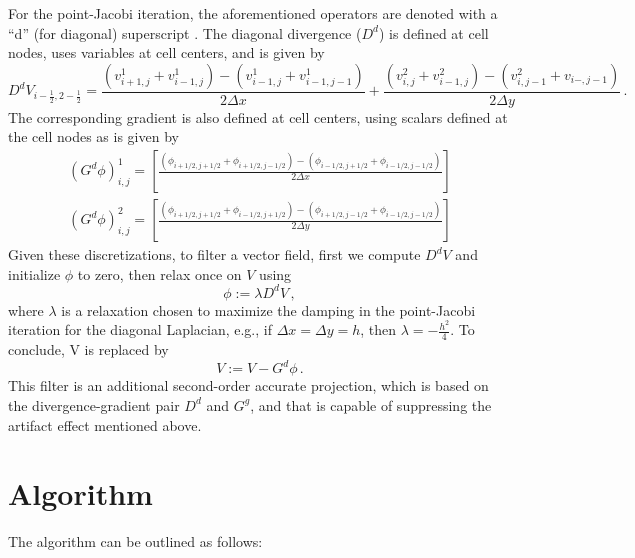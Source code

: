 \documentclass{article}
\begin{document}
For the point-Jacobi iteration, the aforementioned operators are denoted with a ``d'' (for diagonal) superscript . The diagonal divergence ($D^d$) is defined at cell nodes, uses variables at cell centers, and is given by
\begin{equation}
\label{eq:filterdiv}
D^dV_{i - \frac{1}{2}, 2 - \frac{1}{2}} = \frac{(v_{i + 1, j}^1 + v_{i - 1, j}^1) - (v_{i - 1, j}^1 + v_{i - 1, j - 1}^1)}{2 \Delta x} + \frac{(v_{i, j}^2 + v_{i - 1, j}^2) - (v_{i, j - 1}^2 + v_{i - , j - 1})}{2 \Delta y} \,.
\end{equation}
The corresponding gradient  is also defined at cell centers, using scalars defined at the cell nodes as is given by
\begin{equation}
	\begin{split}
	(G^d \phi)_{i, j}^1 = \left[ \frac{\left(\phi_{i + 1/2, j + 1/2} + \phi_{i + 1/2, j - 1/2}\right) - \left( \phi_{i - 1/2, j + 1/2} + \phi_{i - 1/2, j - 1/2} \right)}{2 \Delta x} \right] \\
	(G^d \phi)_{i, j}^2 = \left[ \frac{\left(\phi_{i + 1/2, j + 1/2} + \phi_{i - 1/2, j + 1/2}\right) - \left( \phi_{i + 1/2, j - 1/2} + \phi_{i - 1/2, j - 1/2} \right)}{2 \Delta y} \right]
	\end{split}
\end{equation}
Given these discretizations, to filter a vector field, first we compute $D^d V$ and initialize $\phi$ to zero, then relax once on $V$ using
\begin{equation}
	\phi := \lambda D^d V \,,
\end{equation}
where $\lambda$ is a relaxation chosen to maximize the damping in the point-Jacobi iteration for the diagonal Laplacian, e.g., if $\Delta x = \Delta y = h$, then $\lambda = - \frac{h^2}{4}$. To conclude, V is replaced by
\begin{equation}
	V := V - G^d \phi \,.
\end{equation}
This filter is an additional second-order accurate projection, which is based on the divergence-gradient pair $D^d$ and $G^g$, and that is capable of suppressing the artifact effect mentioned above.

\section{Algorithm}

The algorithm can be outlined as follows:
\end{document}
